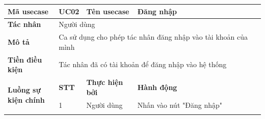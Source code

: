 \documentclass[../DoAn.tex]{subfiles}
\begin{document}
\begin{table}[ht]
    \renewcommand{\arraystretch}{1.2}
    \centering
    \begin{tabular}{| p{0.2\linewidth} | p{0.1\linewidth} | p{0.2\linewidth} | p{0.5\linewidth} |}
        \hline
        \textbf{Mã usecase}                                          & UC02                                                                                              & \textbf{Tên usecase}                                       & Đăng nhập                                                                                                                  \\ \hline
        \multicolumn{1}{|p{0.2\linewidth}|}{\textbf{Tác nhân}}       & \multicolumn{3}{p{0.8\linewidth}|}{Người dùng}                                                                                                                                                                                                                                              \\ \hline
        \multicolumn{1}{|p{0.2\linewidth}|}{\textbf{Mô tả}}          & \multicolumn{3}{p{0.8\linewidth}|}{Ca sử dụng cho phép tác nhân đăng nhập vào tài khoản của mình}                                                                                                                                                                                           \\ \hline
        \multicolumn{1}{|p{0.2\linewidth}|}{\textbf{Tiền điều kiện}} & \multicolumn{3}{p{0.8\linewidth}|}{Tác nhân đã có tài khoản để đăng nhập vào hệ thống}                                                                                                                                                                                                      \\ \hline
        \multirow{8}{\linewidth}{\textbf{Luồng sự kiện chính}}       & \multicolumn{1}{p{0.1\linewidth}|}{\textbf{STT}}                                                  & \multicolumn{1}{p{0.2\linewidth}|}{\textbf{Thực hiện bởi}} & \multicolumn{1}{p{0.5\linewidth}|}{\textbf{Hành động}}                                                                     \\ \cline{2-4}
                                                                     & \multicolumn{1}{p{0.1\linewidth}|}{1}                                                             & \multicolumn{1}{p{0.2\linewidth}|}{Người dùng}             & \multicolumn{1}{p{0.5\linewidth}|}{Nhấn vào nút "Đăng nhập"}                                                               \\ \cline{2-4}

\end{tabular}
\end{table}
\end{document}
